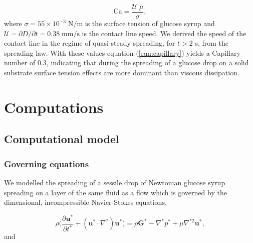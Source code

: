 \documentclass[aip,graphicx]{revtex4-1}
\newcommand{\sym}[1]{\text{#1}}
\newcommand{\pder}[2][]{\frac{\partial#1}{\partial#2}}
\newcommand{\vect}[1]{\bm{#1}}
\begin{document}
\begin{equation}
 \sym{Ca} = \frac{\mathcal{U} \; \mu}{\sigma},
 \label{eqn:capillary}
\end{equation}
where $\sigma=55 \times 10^{-3} \; \sym{N/m}$ is the surface tension of glucose syrup and $\mathcal{U}=\partial D/ \partial t=0.38 \; \sym{mm/s}$ is the contact line speed.
We derived the speed of the contact line in the regime of quasi-steady spreading, for $t > 2$ s, from the spreading law.
With these values equation (\ref{eqn:capillary}) yields a Capillary number of 0.3, indicating that during the spreading of a glucose drop on a solid substrate surface tension effects are more dominant than viscous dissipation.
%

\section{Computations}

\subsection{Computational model}

\subsubsection{Governing equations}

We modelled the spreading of a sessile drop of Newtonian glucose syrup spreading on a layer of the same fluid as a flow which is governed by the dimensional, incompressible Navier-Stokes equations,

\begin{equation}
 \rho \Bigg( \pder[\vect{u}^*]{t^*} + (\vect{u}^* \cdot \nabla^*) \vect{u}^* \Bigg) = \rho \vect{G}^* - \nabla^* p^* + \mu \nabla^{*2} \vect{u}^*,
 \label{eqn:ns_eqn_momentum}
\end{equation}
and
\end{document}

